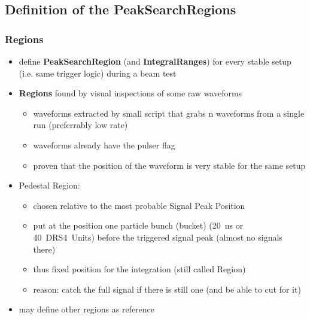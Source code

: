 \documentclass[9pt]{beamer}
\begin{document}
\subsection{Definition of the PeakSearchRegions}
\begin{frame}
\frametitle{Regions}
\begin{itemize}
	\setlength{\itemsep}{\fill}
	\item define \textbf{PeakSearchRegion} (and \textbf{IntegralRanges}) for every stable setup (i.e. same trigger logic) during a beam test
	\item \textbf{Regions} found by visual inspections of some raw waveforms
	\begin{itemize}
		\item waveforms extracted by small script that grabs n waveforms from a single run (preferrably low rate)
		\item waveforms already have the pulser flag
		\item proven that the position of the waveform is very stable for the same setup
	\end{itemize}
	\item Pedestal Region:
	\begin{itemize}
		\item chosen relative to the most probable Signal Peak Position
		\item put at the position one particle bunch (bucket) (\SI{20}{ns} or \SI{40}{DRS4 Units}) before the triggered signal peak (almost no signals there)
		\item thus fixed position for the integration (still called Region)
		\item reason: catch the full signal if there is still one (and be able to cut for it)
	\end{itemize}
	\item may define other regions as reference
\end{itemize}
\end{frame}
\end{document}
